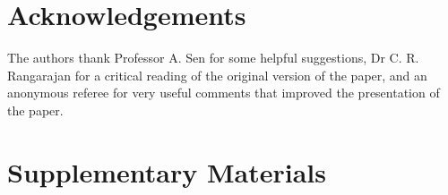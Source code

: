 \documentclass[useAMS,referee]{biom}
\begin{document}

\backmatter


\section*{Acknowledgements}

The authors thank Professor A. Sen for some helpful suggestions,
Dr C. R. Rangarajan for a critical reading of the original version of the
paper, and an anonymous referee for very useful comments that improved
the presentation of the paper.\vspace*{-8pt}


\section*{Supplementary Materials}



%
%   
% 
\end{document}
